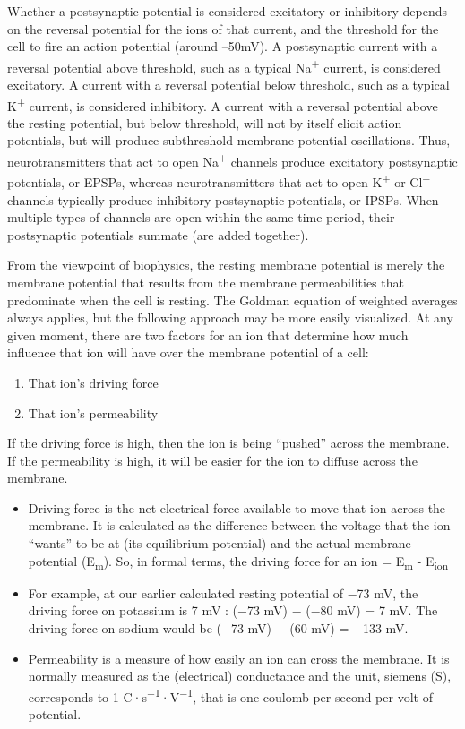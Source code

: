Whether a postsynaptic potential is considered excitatory or inhibitory depends on the reversal potential for the ions of that current, and the threshold for the cell to fire an action potential (around --50mV). A postsynaptic current with a reversal potential above threshold, such as a typical Na\textsuperscript{+} current, is considered excitatory. A current with a reversal potential below threshold, such as a typical K\textsuperscript{+} current, is considered inhibitory. A current with a reversal potential above the resting potential, but below threshold, will not by itself elicit action potentials, but will produce subthreshold membrane potential oscillations. Thus, neurotransmitters that act to open Na\textsuperscript{+} channels produce excitatory postsynaptic potentials, or EPSPs, whereas neurotransmitters that act to open K\textsuperscript{+} or Cl\textsuperscript{−} channels typically produce inhibitory postsynaptic potentials, or IPSPs. When multiple types of channels are open within the same time period, their postsynaptic potentials summate (are added together).

From the viewpoint of biophysics, the resting membrane potential is merely the membrane potential that results from the membrane permeabilities that predominate when the cell is resting. The Goldman equation of weighted averages always applies, but the following approach may be more easily visualized. At any given moment, there are two factors for an ion that determine how much influence that ion will have over the membrane potential of a cell:

\begin{enumerate}
\def\labelenumi{\arabic{enumi}.}
\tightlist
\item
  That ion's driving force
\item
  That ion's permeability
\end{enumerate}

If the driving force is high, then the ion is being ``pushed'' across the membrane. If the permeability is high, it will be easier for the ion to diffuse across the membrane.

\begin{itemize}
\tightlist
\item
  Driving force is the net electrical force available to move that ion across the membrane. It is calculated as the difference between the voltage that the ion ``wants'' to be at (its equilibrium potential) and the actual membrane potential (E\textsubscript{m}). So, in formal terms, the driving force for an ion = E\textsubscript{m} - E\textsubscript{ion}
\item
  For example, at our earlier calculated resting potential of −73 mV, the driving force on potassium is 7 mV : (−73 mV) − (−80 mV) = 7 mV. The driving force on sodium would be (−73 mV) − (60 mV) = −133 mV.
\item
  Permeability is a measure of how easily an ion can cross the membrane. It is normally measured as the (electrical) conductance and the unit, siemens (S), corresponds to 1 C·s\textsuperscript{−1}·V\textsuperscript{−1}, that is one coulomb per second per volt of potential.
\end{itemize}

